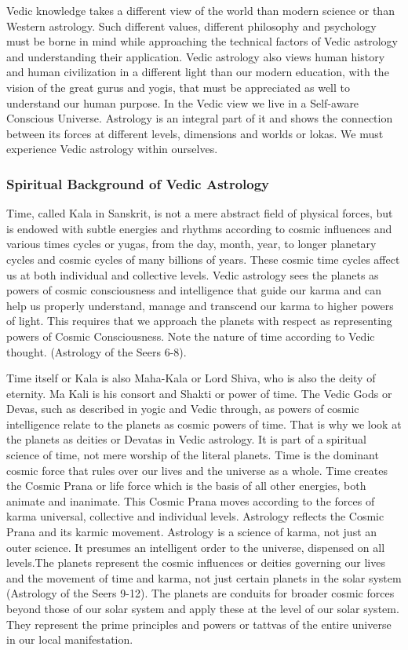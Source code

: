 

Vedic knowledge takes a different view of the world than modern science or than Western astrology. Such different values, different philosophy and psychology must be borne in mind while approaching the technical factors of Vedic astrology and understanding their application.  Vedic astrology also views human history and human civilization in a different light than our modern education, with the vision of the great gurus and yogis, that must be appreciated as well to understand our human purpose. In the Vedic view we live in a Self-aware Conscious Universe. Astrology is an integral part of it and shows the connection between its forces at different levels, dimensions and worlds or lokas. We must experience Vedic astrology within ourselves.

 

\subsubsection{Spiritual Background of Vedic Astrology}
 

Time, called Kala in Sanskrit, is not a mere abstract field of physical forces, but is endowed with subtle energies and rhythms according to cosmic influences and various times cycles or yugas, from the day, month, year, to longer planetary cycles and cosmic cycles of many billions of years. These cosmic time cycles affect us at both individual and collective levels. Vedic astrology sees the planets as powers of cosmic consciousness and intelligence that guide our karma and can help us properly understand, manage and transcend our karma to higher powers of light. This requires that we approach the planets with respect as representing powers of Cosmic Consciousness. Note the nature of time according to Vedic thought. (Astrology of the Seers 6-8).

 

Time itself or Kala is also Maha-Kala or Lord Shiva, who is also the deity of eternity. Ma Kali is his consort and Shakti or power of time. The Vedic Gods or Devas, such as described in yogic and Vedic through, as powers of cosmic intelligence relate to the planets as cosmic powers of time. That is why we look at the planets as deities or Devatas in Vedic astrology. It is part of a spiritual science of time, not mere worship of the literal planets. Time is the dominant cosmic force that rules over our lives and the universe as a whole. Time creates the Cosmic Prana or life force which is the basis of all other energies, both animate and inanimate. This Cosmic Prana moves according to the forces of karma universal, collective and individual levels. Astrology reflects the Cosmic Prana and its karmic movement.  Astrology is a science of karma, not just an outer science. It presumes an intelligent order to the universe, dispensed on all levels.The planets represent the cosmic influences or deities governing our lives and the movement of time and karma, not just certain planets in the solar system (Astrology of the Seers 9-12). The planets are conduits for broader cosmic forces beyond those of our solar system and apply these at the level of our solar system. They represent the prime principles and powers or tattvas of the entire universe in our local manifestation.

